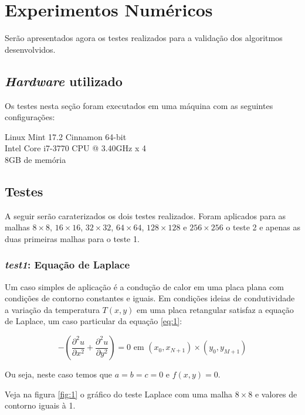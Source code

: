 \documentclass[
	11pt,				%
	oneside,			%
	a4paper,			%
	english,			%
	brazil,				%
	]{article}
\begin{document}
\section{Experimentos Numéricos}
Serão apresentados agora os testes realizados para a validação dos algoritmos desenvolvidos.

\subsection{\textit{Hardware} utilizado}
Os testes nesta seção foram executados em uma máquina com as seguintes configurações:

Linux Mint 17.2 Cinnamon 64-bit \\
\indent Intel Core i7-3770 CPU @ 3.40GHz x 4 \\
\indent 8GB de memória

\subsection{Testes}
A seguir serão caraterizados os dois testes realizados. Foram aplicados para as malhas $8 \times 8$, $16 \times 16$, $32 \times 32$, $64 \times 64$, $128 \times 128$ e $256 \times 256$ o teste 2 e apenas as duas primeiras malhas para o teste 1.

\subsubsection{\textit{test1}: Equação de Laplace}
Um caso simples de aplicação é a condução de calor em uma placa plana com condições de contorno constantes e iguais. Em condições ideias de condutividade a variação da temperatura $T(x,y)$ em uma placa retangular satisfaz a equação de Laplace, um caso particular da equação \eqref{eq:1}:

\begin{equation} \label{eq:2}
- \left(\frac{\partial^2 u}{\partial x^2} + \frac{\partial^2 u}{\partial y^2}\right) = 0
\text{ em } (x_0,x_{N+1}) \times (y_0,y_{M+1})
\end{equation}

Ou seja, neste caso temos que $ a = b = c = 0 $ e $ f(x,y) = 0 $.

Veja na figura \ref{fig:1} o gráfico do teste Laplace com uma malha $8\times8$ e valores de contorno iguais à 1.
\end{document}
